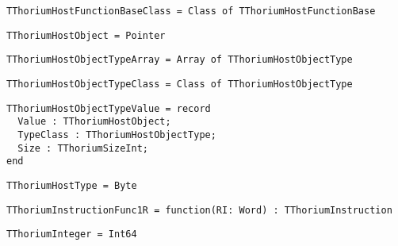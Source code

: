 \begin{verbatim}
TThoriumHostFunctionBaseClass = Class of TThoriumHostFunctionBase
\end{verbatim}
\label{thoriumcore:thorium:tthoriumhostfunctionbaseclass}



\begin{verbatim}
TThoriumHostObject = Pointer
\end{verbatim}
\label{thoriumcore:thorium:tthoriumhostobject}



\begin{verbatim}
TThoriumHostObjectTypeArray = Array of TThoriumHostObjectType
\end{verbatim}
\label{thoriumcore:thorium:tthoriumhostobjecttypearray}



\begin{verbatim}
TThoriumHostObjectTypeClass = Class of TThoriumHostObjectType
\end{verbatim}
\label{thoriumcore:thorium:tthoriumhostobjecttypeclass}



\begin{verbatim}
TThoriumHostObjectTypeValue = record
  Value : TThoriumHostObject;
  TypeClass : TThoriumHostObjectType;
  Size : TThoriumSizeInt;
end

\end{verbatim}
\label{thoriumcore:thorium:tthoriumhostobjecttypevalue}



\begin{verbatim}
TThoriumHostType = Byte
\end{verbatim}
\label{thoriumcore:thorium:tthoriumhosttype}



\begin{verbatim}
TThoriumInstructionFunc1R = function(RI: Word) : TThoriumInstruction
\end{verbatim}
\label{thoriumcore:thorium:tthoriuminstructionfunc1r}



\begin{verbatim}
TThoriumInteger = Int64
\end{verbatim}
\label{thoriumcore:thorium:tthoriuminteger}



